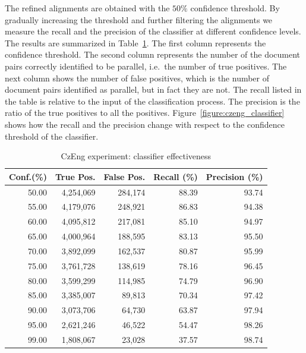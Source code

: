 The refined alignments are obtained with the $50\%$ confidence threshold. By gradually increasing the threshold and further filtering the alignments we measure the recall and the precision of the classifier at different confidence levels. The results are summarized in Table~\ref{table:czeng_refine}. The first column represents the confidence threshold. The second column represents the number of the document pairs correctly identified to be parallel, i.e.\ the number of true positives. The next column shows the number of false positives, which is the number of document pairs identified as parallel, but in fact they are not. The recall listed in the table is relative to the input of the classification process. The precision is the ratio of the true positives to all the positives. Figure~\ref{figure:czeng_classifier} shows how the recall and the precision change with respect to the confidence threshold of the classifier.

\begin{table}[!htb]
	\centering
	\caption{CzEng experiment: classifier effectiveness}
	\label{table:czeng_refine}
	\vspace{1em}
	\begin{tabular}{|r|r|r|r|r|}
		\hline
		\textbf{Conf.(\%)} & \textbf{True Pos.} & \textbf{False Pos.} & \textbf{Recall (\%)} & \textbf{Precision (\%)} \\ \hline
		50.00 & 4,254,069 & 284,174 & 88.39 & 93.74 \\
		55.00 & 4,179,076 & 248,921 & 86.83 & 94.38 \\
		60.00 & 4,095,812 & 217,081 & 85.10 & 94.97 \\
		65.00 & 4,000,964 & 188,595 & 83.13 & 95.50 \\
		70.00 & 3,892,099 & 162,537 & 80.87 & 95.99 \\
		75.00 & 3,761,728 & 138,619 & 78.16 & 96.45 \\
		80.00 & 3,599,299 & 114,985 & 74.79 & 96.90 \\
		85.00 & 3,385,007 & 89,813 & 70.34 & 97.42 \\
		90.00 & 3,073,706 & 64,730 & 63.87 & 97.94 \\
		95.00 & 2,621,246 & 46,522 & 54.47 & 98.26 \\
		99.00 & 1,808,067 & 23,028 & 37.57 & 98.74 \\
		\hline
	\end{tabular}
\end{table}

